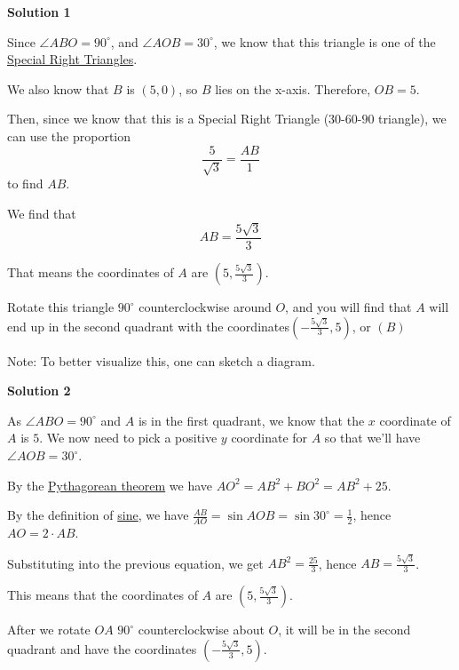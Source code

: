 \begin{enumerate}
\textbf{Solution 1}

Since $\angle ABO=90^\circ$, and $\angle AOB=30^\circ$, we know that this triangle is one of the \href{https://artofproblemsolving.com/wiki/index.php?title=Special\_Right\_Triangles}{Special Right Triangles}.

 We also know that $B$ is $(5,0)$, so $B$ lies on the x-axis. Therefore, $OB = 5$.

 Then, since we know that this is a Special Right Triangle ($30$-$60$-$90$ triangle), we can use the proportion 
 \[\frac{5}{\sqrt 3}=\frac{AB}{1}\] to find $AB$.

 We find that 
 \[AB=\frac{5\sqrt 3}{3}\]

 That means the coordinates of $A$ are $\left(5,\frac{5\sqrt 3}3\right)$.

 Rotate this triangle $90^\circ$ counterclockwise around $O$, and you will find that $A$ will end up in the second quadrant with the coordinates$\left( -\frac{5\sqrt 3}3, 5\right)$, or $\boxed{(B)}$

 Note: To better visualize this, one can sketch a diagram.

 


 


 



\textbf{Solution 2}

As $\angle ABO=90^\circ$ and $A$ is in the first quadrant, we know that the $x$ coordinate of $A$ is $5$. We now need to pick a positive $y$ coordinate for $A$ so that we'll have $\angle AOB=30^\circ$. 

 By the \href{https://artofproblemsolving.com/wiki/index.php?title=Pythagorean\_theorem}{Pythagorean theorem} we have $AO^2 = AB^2 + BO^2 = AB^2 + 25$. 

 By the definition of \href{https://artofproblemsolving.com/wiki/index.php?title=Sine}{sine}, we have $\frac{AB}{AO} = \sin AOB = \sin 30^\circ = \frac 12$, hence $AO=2\cdot AB$.

 Substituting into the previous equation, we get $AB^2 = \frac{25}3$, hence $AB=\frac{5\sqrt 3}3$.

 This means that the coordinates of $A$ are $\left(5,\frac{5\sqrt 3}3\right)$. 

 After we rotate $OA$ $90^\circ$ counterclockwise about $O$, it will be in the second quadrant and have the coordinates $\boxed{ \left( -\frac{5\sqrt 3}3, 5\right) }$.

 




\end{enumerate}
